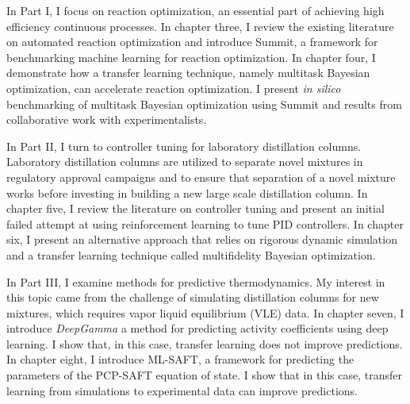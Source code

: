 In Part I, I focus on reaction optimization, an essential part of achieving high efficiency continuous processes. In chapter three, I review the existing literature on automated reaction optimization and introduce Summit, a framework for benchmarking machine learning for reaction optimization.  In chapter four, I demonstrate how a transfer learning technique, namely multitask Bayesian optimization, can accelerate reaction optimization. I present \textit{in silico} benchmarking of multitask Bayesian optimization using Summit and results from collaborative work with experimentalists.

In Part II, I turn to controller tuning for laboratory distillation columns. Laboratory distillation columns are utilized to separate novel mixtures in regulatory approval campaigns and to ensure that separation of a novel mixture works before investing in building a new large scale distillation column. In chapter five, I review the literature on controller tuning and present an initial failed attempt at using reinforcement learning to tune PID controllers. In chapter six, I present an alternative approach that relies on rigorous dynamic simulation and a transfer learning technique called multifidelity Bayesian optimization.

In Part III, I examine methods for predictive thermodynamics. My interest in this topic came from the challenge of simulating distillation columns for new mixtures, which requires vapor liquid equilibrium (VLE) data. In chapter seven, I introduce \textit{DeepGamma} a method for predicting activity coefficients using deep learning. I show that, in this case, transfer learning does not improve predictions. In chapter eight, I introduce ML-SAFT, a framework for predicting the parameters of the PCP-SAFT equation of state. I show that in this case, transfer learning from simulations to experimental data can improve predictions.






